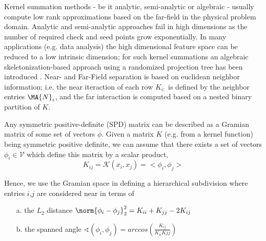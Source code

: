 

Kernel summation methods - be it analytic, semi-analytic or algebraic - usually compute low rank approximations based on the far-field in the physical problem domain. Analytic and semi-analytic approaches fail in high dimensions as the number of required check and seed points grow exponentially.
In many applications (e.g. data analysis) the high dimensional feature space can be reduced to a low intrinsic dimension; for such kernel summations an algebraic skeletonization-based approach using a randomized projection tree has been introduced \cite{march-xiao-yu-biros15}. Near- and Far-Field separation is based on euclidean neighbor information; i.e. the near iteraction of each row $K_{i:}$ is defined by the
neighbor entries $\MA{N}_i$, and the far interaction is 
computed based on a nested binary partition of $K$.

Any symmetric positive-definite (SPD) matrix can be described as a Gramian matrix of some set of vectors $\phi$.
Given a matrix $K$ (e.g. from a kernel function) being symmetric positive definite, we can assume that there exists a set of vectors $\phi_i \in \mathcal{V}$ which define this matrix by a scalar product,  $$K_{ij}=\mathcal{K} (x_i,x_j)=<\phi_i,\phi_j>$$ 


Hence, we use the Gramian space in defining a hierarchical subdivision where entries $i$,$j$ are considered near in terms of 
\begin{itemize}
\item[a.] the $L_2$ distance $\norm{\phi_i-\phi_j}_2^2=K_{ii}+K_{jj}-2K_{ij}$
\item[b.] the spanned angle $\sphericalangle(\phi_i,\phi_j)=arccos(\frac{K_{ij}}{K_{ii}K{jj}})$
\end{itemize}

